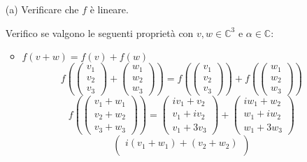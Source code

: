 \documentclass[a4paper]{article}
\theoremstyle{break}
\theoremstyle{break}
\theoremstyle{break}
\theoremstyle{break}
\begin{document}
\begin{enumerate}
	\item[(a)] Verificare che \( f \) è lineare.

	      \vspace{1em}
	      \noindent Verifico se valgono le seguenti proprietà con \( v, w \in \mathbb{C}^3 \) e \( \alpha \in \mathbb{C} \):
	      \begin{itemize}
		      \item
		            \(
		            f(v + w) = f(v) + f(w)
		            \)
		            \[
			            f \left( \begin{pmatrix} v_1\\v_2\\v_3 \end{pmatrix} +
			            \begin{pmatrix} w_1\\w_2\\w_3 \end{pmatrix}  \right)
			            =
			            f \left( \begin{pmatrix} v_1\\v_2\\v_3 \end{pmatrix}  \right)
			            +
			            f \left( \begin{pmatrix} w_1\\w_2\\w_3 \end{pmatrix}  \right)
		            \]
		            \[
			            f \left( \begin{pmatrix} v_1 + w_1\\ v_2 + w_2\\ v_3 + w_3 \end{pmatrix}  \right)
			            =
			            \begin{pmatrix}
				            iv_1 + v_2 \\
				            v_1 + iv_2 \\
				            v_1 + 3v_3
			            \end{pmatrix}
			            +
			            \begin{pmatrix}
				            iw_1 + w_2 \\
				            w_1 + iw_2 \\
				            w_1 + 3w_3
			            \end{pmatrix}
		            \]
		            \[
			            \begin{pmatrix}
				            i(v_1 + w_1) + (v_2 + w_2) \\

\end{pmatrix}\]
\end{itemize}
\end{enumerate}
\end{document}
